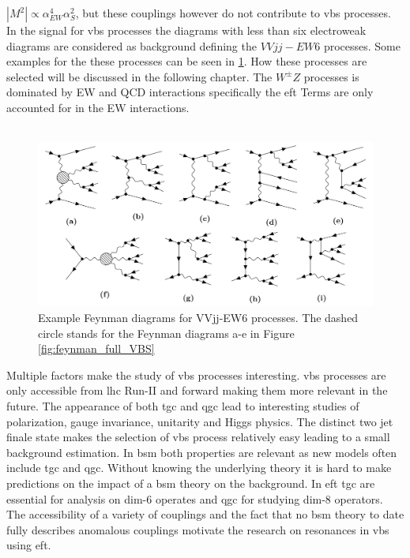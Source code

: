 \documentclass[../Bachelorarbeit.tex]{subfiles}
\begin{document}
$\left\lvert M^{2} \right\rvert \propto \alpha_{EW}^{4}\alpha_{S}^{2}$, but these couplings however do not contribute to \acrshort{vbs} processes.
In the signal for \acrshort{vbs} processes the diagrams with less than six electroweak diagrams are considered as background defining the $VVjj-EW6$ processes.
Some examples for the these processes can be seen in \ref{fig:EW6}. How these processes are selected will be discussed in the following chapter.
The $W^{\pm}Z$ processes is dominated by EW and QCD interactions specifically the \acrshort{eft} Terms are only accounted for in the EW interactions.\\\\
\begin{figure}[h]
    \centering
    \includegraphics[width=\textwidth]{images/EW6.png}
    \caption{Example Feynman diagrams for VVjj-EW6 processes. The dashed circle stands for the Feynman diagrams a-e in Figure \ref*{fig:feynman_full_VBS}}
    \label{fig:EW6}
\end{figure}
Multiple factors make the study of \acrshort{vbs} processes interesting. \acrshort{vbs} processes are only accessible from \acrshort{lhc} Run-II and forward making them more relevant in the future.
The appearance of both \acrshort{tgc} and \acrshort{qgc} lead to interesting studies of polarization, gauge invariance, unitarity and Higgs physics.
The distinct two jet finale state makes the selection of \acrshort{vbs} process relatively easy leading to a small background estimation. In \acrshort{bsm} both properties
are relevant as new models often include \acrshort{tgc} and \acrshort{qgc}. Without knowing the underlying theory it is hard to make predictions on the impact of a \acrshort{bsm} theory on the background.
In \acrshort{eft} \acrshort{tgc} are essential for analysis on dim-6 operates and \acrshort{qgc} for studying dim-8 operators. The accessibility of a variety of couplings and
the fact that no \acrshort{bsm} theory to date fully describes anomalous couplings motivate the research on resonances in \acrshort{vbs} using \acrshort{eft}.
\end{document}
